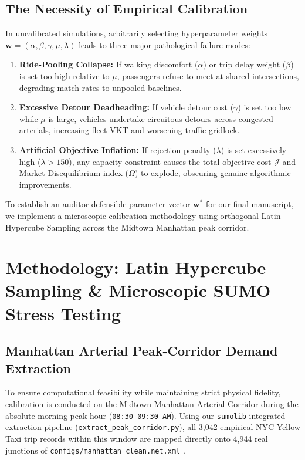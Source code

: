\documentclass[11pt,a4paper]{article}
\begin{document}
\subsection{The Necessity of Empirical Calibration}
In uncalibrated simulations, arbitrarily selecting hyperparameter weights $\mathbf{w} = (\alpha, \beta, \gamma, \mu, \lambda)$ leads to three major pathological failure modes:
\begin{enumerate}
    \item \textbf{Ride-Pooling Collapse:} If walking discomfort ($\alpha$) or trip delay weight ($\beta$) is set too high relative to $\mu$, passengers refuse to meet at shared intersections, degrading match rates to unpooled baselines.
    \item \textbf{Excessive Detour Deadheading:} If vehicle detour cost ($\gamma$) is set too low while $\mu$ is large, vehicles undertake circuitous detours across congested arterials, increasing fleet VKT and worsening traffic gridlock.
    \item \textbf{Artificial Objective Inflation:} If rejection penalty ($\lambda$) is set excessively high ($\lambda > 150$), any capacity constraint causes the total objective cost $\mathcal{J}$ and Market Disequilibrium index ($\Omega$) to explode, obscuring genuine algorithmic improvements.
\end{enumerate}

To establish an auditor-defensible parameter vector $\mathbf{w}^*$ for our final manuscript, we implement a microscopic calibration methodology using orthogonal Latin Hypercube Sampling across the Midtown Manhattan peak corridor.

\section{Methodology: Latin Hypercube Sampling \& Microscopic SUMO Stress Testing}

\subsection{Manhattan Arterial Peak-Corridor Demand Extraction}
To ensure computational feasibility while maintaining strict physical fidelity, calibration is conducted on the Midtown Manhattan Arterial Corridor during the absolute morning peak hour (\texttt{08:30--09:30 AM}). Using our \texttt{sumolib}-integrated extraction pipeline (\texttt{extract\_peak\_corridor.py}), all 3,042 empirical NYC Yellow Taxi trip records within this window are mapped directly onto 4,944 real junctions of \texttt{configs/manhattan\_clean.net.xml} \cite{bib3}. 
\end{document}
